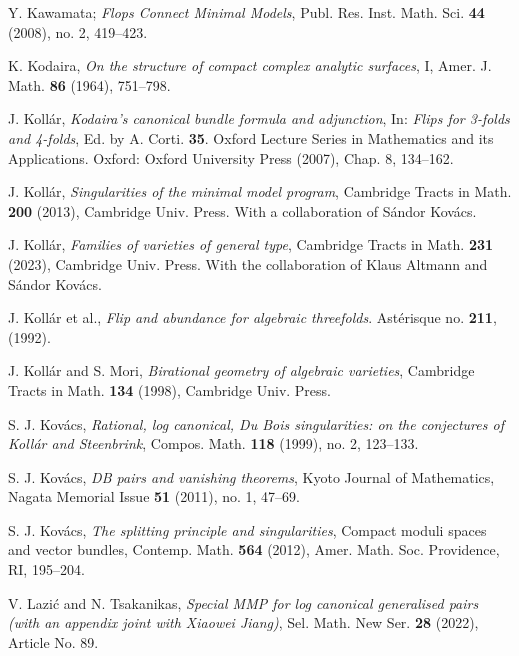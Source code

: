 \documentclass[11pt]{amsart}
\numberwithin{equation}{section}
\theoremstyle{definition}
\theoremstyle{definition}
\theoremstyle{definition}
\begin{document}
\begin{thebibliography}{99}
   Y. Kawamata; \textit{Flops {{Connect Minimal Models}}}, Publ. Res. Inst. Math. Sci. \textbf{44} (2008), no. 2, 419–423.

   K. Kodaira, \textit{On the structure of compact complex analytic surfaces}, I, Amer. J. Math. \textbf{86} (1964), 751--798.


   J. Koll\'ar, \textit{Kodaira’s canonical bundle formula and adjunction}, In: \textit{Flips for 3-folds and 4-folds}, Ed. by A. Corti. \textbf{35}. Oxford Lecture Series in Mathematics and its Applications. Oxford: Oxford University Press (2007), Chap. 8, 134--162.

   J. Koll\'ar, \textit{Singularities of the minimal model program}, Cambridge Tracts in Math. \textbf{200} (2013), Cambridge Univ. Press. With a collaboration of S\'andor Kov\'acs.

   J. Koll\'ar, \textit{Families of varieties of general type}, Cambridge Tracts in Math. \textbf{231} (2023), Cambridge Univ. Press. With the collaboration of Klaus Altmann and S\'andor Kov\'acs.


   J. Koll\'{a}r et al., \textit{Flip and abundance for algebraic threefolds}. Ast\'{e}risque no. \textbf{211}, (1992).

   J. Koll\'{a}r and S. Mori, \textit{Birational geometry of algebraic varieties}, Cambridge Tracts in Math. \textbf{134} (1998), Cambridge Univ. Press.

   S. J. Kov\'acs, \textit{Rational, log canonical, Du Bois singularities: on the conjectures of Koll\'ar and Steenbrink}, Compos. Math. \textbf{118} (1999), no. 2, 123--133.

   S. J. Kov\'acs, \textit{DB pairs and vanishing theorems}, Kyoto Journal of Mathematics, Nagata Memorial Issue \textbf{51} (2011), no. 1, 47--69.

   S. J. Kov\'acs, \textit{The splitting principle and singularities}, Compact moduli spaces and vector bundles, Contemp. Math. \textbf{564} (2012), Amer. Math. Soc. Providence, RI, 195--204.



   V. Lazi\'c and N. Tsakanikas, \textit{Special MMP for log canonical generalised pairs (with an appendix joint with Xiaowei Jiang)}, Sel. Math. New Ser. \textbf{28} (2022), Article No. 89.


\end{thebibliography}
\end{document}
